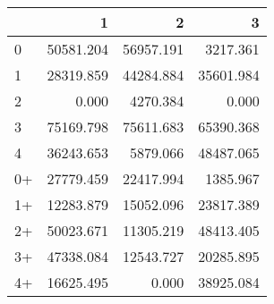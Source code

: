 \begin{tabular}{lrrr}
\toprule
     &         1 &         2 &         3 \\
\midrule
 0   & \num{50581.204} & \num{56957.191} &  \num{3217.361} \\
 1   & \num{28319.859} & \num{44284.884} & \num{35601.984} \\
 2   &     \num{0.000} &  \num{4270.384} &     \num{0.000} \\
 3   & \num{75169.798} & \num{75611.683} & \num{65390.368} \\
 4   & \num{36243.653} &  \num{5879.066} & \num{48487.065} \\
 0+  & \num{27779.459} & \num{22417.994} &  \num{1385.967} \\
 1+  & \num{12283.879} & \num{15052.096} & \num{23817.389} \\
 2+  & \num{50023.671} & \num{11305.219} & \num{48413.405} \\
 3+  & \num{47338.084} & \num{12543.727} & \num{20285.895} \\
 4+  & \num{16625.495} &     \num{0.000} & \num{38925.084} \\
\bottomrule
\end{tabular}